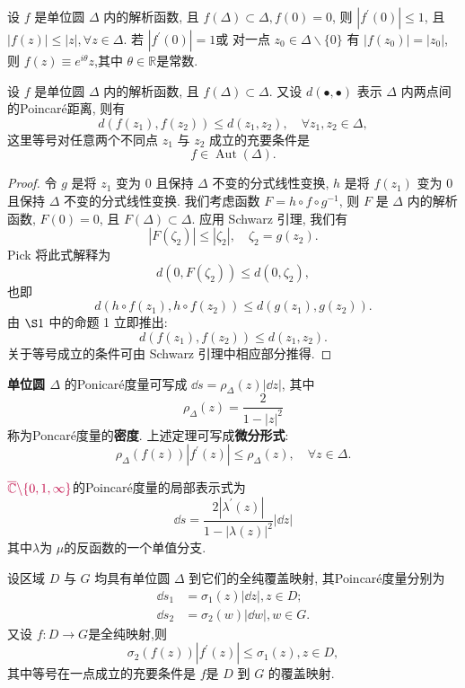 \begin{thm}[Schwarz 引理] \label{thm: Schwarz lem}
    设 $f$ 是单位圆 $\Delta$ 内的解析函数, 且 $f(\Delta)\subset \Delta, f(0)=0$, 则 $|f^\prime (0)|\leqslant 1$, 且 $|f(z)|\leqslant |z|,\forall z\in \Delta$. 若 $|f^\prime (0)|=1$或 对一点 $z_0\in \Delta\backslash \{0\}$ 有 $|f(z_0)|=|z_0|$, 则 $f(z)\equiv e^{i\theta}z$,其中 $\theta\in \mathbb{R}$是常数.
\end{thm}
\begin{thm}\label{thm: Schwarz - pick thm}
    设 $f$ 是单位圆 $\Delta$ 内的解析函数, 且 $f(\Delta)\subset \Delta$. 又设 $d(\bullet,\bullet)$ 表示 $\Delta$ 内两点间的Poincar\'{e}距离, 则有
    \[d(f(z_1),f(z_2))\leqslant d(z_1,z_2),\quad\forall z_1,z_2\in \Delta,\]
    这里等号对任意两个不同点 $z_1$ 与 $z_2$ 成立的充要条件是
    \[f\in \operatorname{Aut} (\Delta).\]
\end{thm}
\begin{proof}
    令 $g$ 是将 $z_1$ 变为 0 且保持 $\Delta$ 不变的分式线性变换, $h$ 是将 $f\left(z_1\right)$ 变为 0 且保持 $\Delta$ 不变的分式线性变换. 我们考虑函数 $F=h \circ f \circ g^{-1}$, 则 $F$ 是 $\Delta$ 内的解析函数, $F(0)=0$, 且 $F(\Delta) \subset \Delta$. 应用 Schwarz 引理, 我们有
$$
\left|F\left(\zeta_2\right)\right| \leqslant\left|\zeta_2\right|, \quad \zeta_2=g\left(z_2\right) .
$$
Pick 将此式解释为
$$
d\left(0, F\left(\zeta_2\right)\right) \leqslant d\left(0, \zeta_2\right),
$$
也即
$$
d\left(h \circ f\left(z_1\right), h \circ f\left(z_2\right)\right) \leqslant d\left(g\left(z_1\right), g\left(z_2\right)\right) .
$$
由 $\S 1$ 中的命题 1 立即推出:
$$
d\left(f\left(z_1\right), f\left(z_2\right)\right) \leqslant d\left(z_1, z_2\right) .
$$
关于等号成立的条件可由 Schwarz 引理中相应部分推得.
\end{proof}
\begin{defi}[Poincar\'{e}度量]
    \textbf{\color{magenta} 单位圆 $\Delta$ }的Ponicar\'{e}度量可写成 $\dd s=\rho_\Delta (z) |\dd z|$, 其中
    \[\rho_\Delta (z)=\frac{2}{1-|z|^2}\]
    称为Poncar\'{e}度量的\textbf{密度}. 上述定理可写成\textbf{微分形式}:
    \[\rho_\Delta (f(z))|f^\prime (z)|\leqslant \rho_\Delta (z),\quad\forall z\in \Delta.\]

    $\color{purple}{\overline{\mathbb{C}}\backslash \{0,1,\infty\}}$的Poincar\'{e}度量的局部表示式为
    \[\dd s=\frac{2|\lambda^\prime(z)|}{1-|\lambda(z)|^2}|\dd z|
    \]
    其中$\lambda$为 $\mu$的反函数的一个单值分支.
\end{defi}
\begin{thm}[广义Schwarz引理]\label{thm: extension of Schwarz lem}
    设区域 $D$ 与 $G$ 均具有单位圆 $\Delta$ 到它们的全纯覆盖映射, 其Poincar\'{e}度量分别为
    \begin{align*}
        \dd s_1 &=\sigma_1 (z) |\dd z|,z\in D;\\ 
        \dd s_2 &=\sigma_2 (w) |\dd w|,w\in G.
    \end{align*}
    又设 $f\colon D\to G$是全纯映射,则
    \[\sigma_2 (f(z))|f^\prime (z)|\leqslant \sigma_1 (z),z\in D,\]
    其中等号在一点成立的充要条件是 $f$是 $D$ 到 $G$ 的覆盖映射.
\end{thm}

